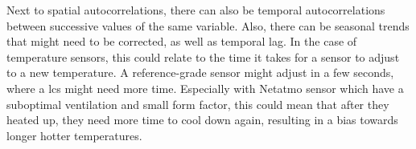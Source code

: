 Next to spatial autocorrelations, there can also be temporal autocorrelations between successive values of the same variable. Also, there can be seasonal trends that might need to be corrected, as well as temporal lag. In the case of temperature sensors, this could relate to the time it takes for a sensor to adjust to a new temperature. A reference-grade sensor might adjust in a few seconds, where a \gls{lcs} might need more time. Especially with Netatmo sensor which have a suboptimal ventilation and small form factor, this could mean that after they heated up, they need more time to cool down again, resulting in a bias towards longer hotter temperatures.
